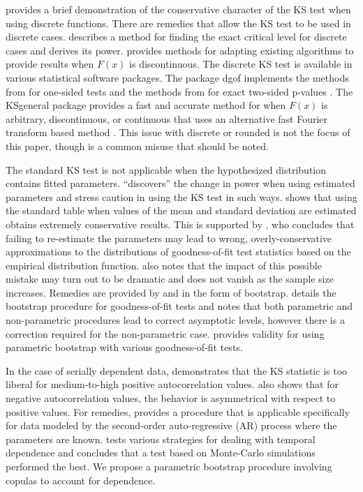 \documentclass[12pt, letterpaper, titlepage]{article}
\begin{document}
\citet{Noether} provides a brief demonstration of the 
conservative character of the KS test when using discrete functions. 
There are remedies that allow the KS test to be used in discrete cases. 
\citet{Conover} describes a method for finding the exact critical level for 
discrete cases and derives its power. \citet{Gleser} provides methods for 
adapting existing algorithms to provide results when $F(x)$ is discontinuous.
The discrete KS test is available in various statistical software packages.
The package \textsf{dgof} implements the methods from \citet{Conover} for 
one-sided tests and the methods from \citet{Gleser} for exact two-sided 
p-values \citep{Arnold}. The \textsf{KSgeneral} package provides a fast and 
accurate method for when $F(x)$ is arbitrary, discontinuous, or continuous that 
uses an alternative fast Fourier transform based method \citep{Dimitrova}.
This issue with discrete or rounded is not the focus of this paper, though is a
common misuse that should be noted.


The standard KS test is not applicable when the hypothesized distribution 
contains fitted parameters. \citet{Steinskog} ``discovers'' the change in power 
when using estimated parameters and stress caution in using the KS test in such 
ways. \citet{Lilliefors} shows that using the standard table when values of the 
mean and standard deviation are estimated obtains extremely conservative 
results. This is supported by \citet{Capasso}, who concludes that failing to 
re-estimate the parameters may lead to wrong, overly-conservative approximations 
to the distributions of goodness-of-fit test statistics based on the empirical 
distribution function. \citet{Capasso} also notes that the impact of this 
possible mistake may turn out to be dramatic and does not vanish as the sample 
size increases. Remedies are provided by \citet{Babu} and \citet{Genest} in the
form of bootstrap.  \citet{Babu} details the bootstrap
procedure for goodness-of-fit tests and notes that both parametric and 
non-parametric procedures lead to correct asymptotic levels, however there 
is a correction required for the non-parametric case.
\citet{Genest} provides validity for using parametric 
bootstrap with various goodness-of-fit tests.



In the case of serially dependent data, \citet{Durilleul} demonstrates that the 
KS statistic is too liberal for medium-to-high positive autocorrelation values. 
\citet{Durilleul} also shows that for negative autocorrelation values, the 
behavior is asymmetrical with respect to positive values. For remedies, 
\citet{Weiss} provides a procedure that is applicable specifically for data 
modeled by the second-order auto-regressive (AR) process where the parameters 
are known. \citet{Lanzante} tests various strategies for dealing with temporal 
dependence and concludes that a test based on Monte-Carlo simulations performed 
the best. We propose a parametric bootstrap procedure involving copulas to 
account for dependence.
\end{document}
